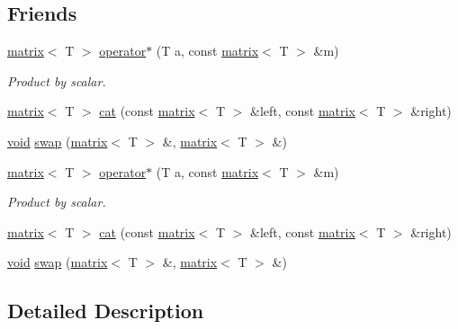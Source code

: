 \subsection*{Friends}
\begin{DoxyCompactItemize}
\item 
\hyperlink{classlibNumerics_1_1matrix}{matrix}$<$ T $>$ \hyperlink{classlibNumerics_1_1matrix_a492932acc21b0979ee8a57409cd091da}{operator$\ast$} (T a, const \hyperlink{classlibNumerics_1_1matrix}{matrix}$<$ T $>$ \&m)
\begin{DoxyCompactList}\small\item\em Product by scalar. \end{DoxyCompactList}\item 
\hyperlink{classlibNumerics_1_1matrix}{matrix}$<$ T $>$ \hyperlink{classlibNumerics_1_1matrix_a8f11dd81601d24fac99dcd35bfd99281}{cat} (const \hyperlink{classlibNumerics_1_1matrix}{matrix}$<$ T $>$ \&left, const \hyperlink{classlibNumerics_1_1matrix}{matrix}$<$ T $>$ \&right)
\item 
\hyperlink{png_8h_aa8c59027f9ab2769342f248709d68d17}{void} \hyperlink{classlibNumerics_1_1matrix_a74450cc2b2e883644cff2e3983ebd56f}{swap} (\hyperlink{classlibNumerics_1_1matrix}{matrix}$<$ T $>$ \&, \hyperlink{classlibNumerics_1_1matrix}{matrix}$<$ T $>$ \&)
\item 
\hyperlink{classlibNumerics_1_1matrix}{matrix}$<$ T $>$ \hyperlink{classlibNumerics_1_1matrix_a492932acc21b0979ee8a57409cd091da}{operator$\ast$} (T a, const \hyperlink{classlibNumerics_1_1matrix}{matrix}$<$ T $>$ \&m)
\begin{DoxyCompactList}\small\item\em Product by scalar. \end{DoxyCompactList}\item 
\hyperlink{classlibNumerics_1_1matrix}{matrix}$<$ T $>$ \hyperlink{classlibNumerics_1_1matrix_a8f11dd81601d24fac99dcd35bfd99281}{cat} (const \hyperlink{classlibNumerics_1_1matrix}{matrix}$<$ T $>$ \&left, const \hyperlink{classlibNumerics_1_1matrix}{matrix}$<$ T $>$ \&right)
\item 
\hyperlink{png_8h_aa8c59027f9ab2769342f248709d68d17}{void} \hyperlink{classlibNumerics_1_1matrix_a74450cc2b2e883644cff2e3983ebd56f}{swap} (\hyperlink{classlibNumerics_1_1matrix}{matrix}$<$ T $>$ \&, \hyperlink{classlibNumerics_1_1matrix}{matrix}$<$ T $>$ \&)
\end{DoxyCompactItemize}


\subsection{Detailed Description}
